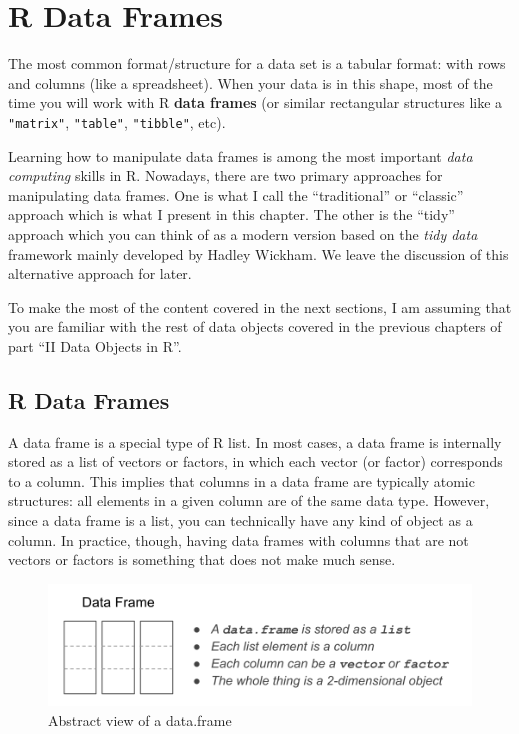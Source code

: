 \documentclass[
]{book}
\begin{document}
\hypertarget{dataframes}{%
\chapter{R Data Frames}\label{dataframes}}

The most common format/structure for a data set is a tabular format:
with rows and columns (like a spreadsheet). When your data is in this shape,
most of the time you will work with R \textbf{data frames} (or similar rectangular
structures like a \texttt{"matrix"}, \texttt{"table"}, \texttt{"tibble"}, etc).

Learning how to manipulate data frames is among the most important
\emph{data computing} skills in R.
Nowadays, there are two primary approaches for manipulating data frames. One
is what I call the ``traditional'' or ``classic'' approach which is what I present
in this chapter. The other is the ``tidy'' approach which you can think of as a
modern version based on the \emph{tidy data} framework mainly developed by
Hadley Wickham. We leave the discussion of this alternative approach for later.

To make the most of the content covered in the next sections, I am assuming
that you are familiar with the rest of data objects covered in the previous
chapters of part ``II Data Objects in R''.

\hypertarget{r-data-frames}{%
\section{R Data Frames}\label{r-data-frames}}

A data frame is a special type of R list. In most cases, a data frame is
internally stored as a list of vectors or factors, in which each vector
(or factor) corresponds to a column. This implies that columns in a data frame
are typically atomic structures: all elements in a given column are of the same
data type. However, since a data frame is a list, you
can technically have any kind of object as a column. In practice, though,
having data frames with columns that are not vectors or factors is something
that does not make much sense.

\begin{figure}

{\centering \includegraphics[width=0.75\linewidth]{images/objects/obj-dataframe} 

}

\caption{Abstract view of a data.frame}\label{fig:unnamed-chunk-137}
\end{figure}
\end{document}
